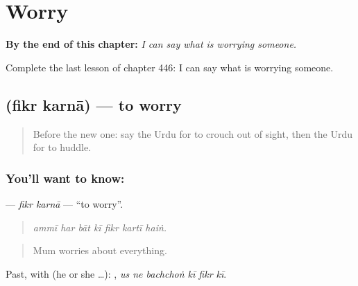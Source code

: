 
\chapter{Worry}
\label{ch:ur-worry}

\begin{chapteropening}
\textbf{By the end of this chapter:} \emph{I can say what is worrying someone.}

Complete the last lesson of chapter 446: I can say what is worrying someone.
\end{chapteropening}

\section[\texorpdfstring{\ur{فکر} \ur{کرنا} (fikr karnā)}{فکر کرنا (fikr karnā)}]{  (fikr karnā) — to worry}

\label{lesson:UR-C446-fikr-karna}



\begin{quote}
Before the new one: say the Urdu for to crouch out of sight, then the Urdu for to huddle.
\end{quote}

\subsection*{You'll want to know:  }
\textbf{ } — \emph{fikr karnā} — \textquotedblleft{}to worry\textquotedblright{}.

\begin{quote}
      
\end{quote}

\begin{quote}
\emph{ammī har bāt kī fikr kartī haiṅ.}
\end{quote}

\begin{quote}
Mum worries about everything.
\end{quote}

Past, with  (he or she …):      , \emph{us ne bachchoṅ kī fikr kī}.

